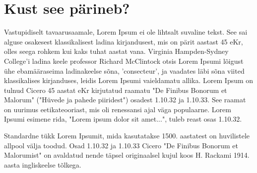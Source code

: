 \documentclass{21kuur}
\begin{document}
\section{Kust see pärineb?}
Vastupidiselt tavaarusaamale, Lorem Ipsum ei ole lihtsalt suvaline tekst. See sai alguse osakesest klassikalisest ladina kirjandusest, mis on pärit aastast 45 eKr, olles seega rohkem kui kaks tuhat aastat vana. Virginia Hampden-Sydney College'i ladina keele professor Richard McClintock otsis Lorem Ipsumi lõigust ühe ebamääraseima ladinakeelse sõna, 'consecteur', ja vaadates läbi sõna viited klassikalises kirjanduses, leidis Lorem Ipsumi vaieldamatu allika. Lorem Ipsum on tulnud Cicero 45 aastat eKr kirjutatud raamatu "De Finibus Bonorum et Malorum" ("Hüvede ja pahede piiridest") osadest 1.10.32 ja 1.10.33. See raamat on uurimus eetikateooriast, mis oli renessansi ajal väga populaarne. Lorem Ipsumi esimene rida, "Lorem ipsum dolor sit amet...", tuleb reast osas 1.10.32.

Standardne tükk Lorem Ipsumit, mida kasutatakse 1500. aastatest on huvilistele allpool välja toodud. Osad 1.10.32 ja 1.10.33 Cicero "De Finibus Bonorum et Malorumist" on avaldatud nende täpsel originaalsel kujul koos H. Rackami 1914. aasta ingliskeelse tõlkega.
\end{document}

